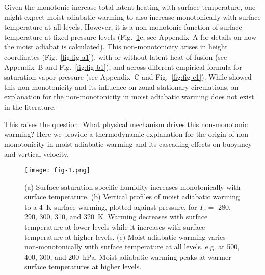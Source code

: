 \documentclass[draft]{ametsocV6.1}
\begin{document}
Given the monotonic increase total latent heating with surface temperature, one might expect moist adiabatic warming to also increase monotonically with surface temperature at all levels. However, it is a non-monotonic function of surface temperature at fixed pressure levels (Fig.~\ref{fig:fig-1}c, see Appendix~A for details on how the moist adiabat is calculated). This non-monotonicity arises in height coordinates (Fig.~\ref{fig:fig-a1}), with or without latent heat of fusion (see Appendix~B and Fig.~\ref{fig:fig-b1}), and across different empirical formula for saturation vapor pressure (see Appendix~C and Fig.~\ref{fig:fig-c1}). While \citet{levine2016} showed this non-monotonicity and its influence on zonal stationary circulations, an explanation for the non-monotonicity in moist adiabatic warming does not exist in the literature.

This raises the question: What physical mechanism drives this non-monotonic warming? Here we provide a thermodynamic explanation for the origin of non-monotonicity in moist adiabatic warming and its cascading effects on buoyancy and vertical velocity.

\begin{figure}[htbp]
 \centering
 \texttt{[image: fig-1.png]}\\
\caption{(a) Surface saturation specific humidity increases monotonically with surface temperature. (b) Vertical profiles of moist adiabatic warming to a 4~K surface warming, plotted against pressure, for $T_s = $ 280, 290, 300, 310, and 320~K. Warming decreases with surface temperature at lower levels while it increases with surface temperature at higher levels. (c) Moist adiabatic warming varies non-monotonically with surface temperature at all levels, e.g. at 500, 400, 300, and 200~hPa. Moist adiabatic warming peaks at warmer surface temperatures at higher levels.}
\label{fig:fig-1}
\end{figure}
\end{document}
